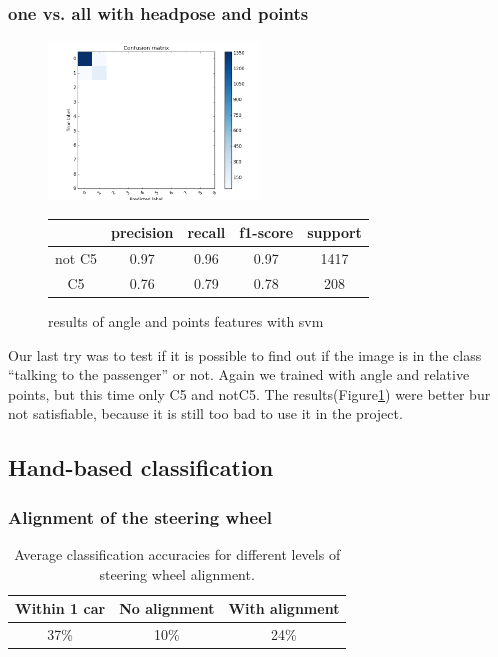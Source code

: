 \documentclass[10pt,twocolumn,letterpaper]{article}
\begin{document}
\subsubsection{one vs. all with headpose and points}
\begin{figure}[h]
	\centering
	\includegraphics[width=0.5\textwidth]{c5ornot.png}\hspace{0.01\textwidth}
	\begin{tabular}{c||c|c|c|c}
	  & precision&recall&f1-score&support\\	\hline
	  not C5&0.97&0.96&0.97&1417\\
	  C5&0.76&0.79&0.78&208
	\end{tabular}
	\caption{results of angle and points features with svm}
	\label{C5ornot}
	\end{figure}
Our last try was to test if it is possible to find out if the image is in the class ``talking to the passenger'' or not. Again we trained with angle and relative points, but this time only C5 and notC5. The results(Figure\ref{C5ornot}) were better bur not satisfiable, because it is still too bad to use it in the project.

\subsection{Hand-based classification}

	\subsubsection{Alignment of the steering wheel}
	\begin{table}
		\begin{tabular}{c|c|c}
			Within 1 car & No alignment & With alignment \\ 
			\hline 
			37\% & 10\% & 24\% \\ 
		\end{tabular} 
		\caption{Average classification accuracies for different levels of steering wheel alignment.}
		\label{hand_estimation_alignment}
	\end{table}
	
\end{document}
